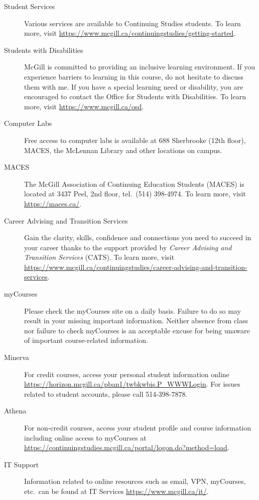 \documentclass{article}
\begin{document}
\begin{description}
\item[Student Services]{Various services are available to Continuing
  Studies students. To learn more, visit \url{https://www.mcgill.ca/continuingstudies/getting-started}.}
\item[Students with Disabilities]{McGill is committed to providing an
  inclusive learning environment. If you experience barriers to
  learning in this course, do not hesitate to discuss them with me. If
  you have a special learning need or disability, you are encouraged
  to contact the Office for Students with Disabilities. To learn more,
  visit \url{https://www.mcgill.ca/osd}.}
 \item[Computer Labs]{Free access to computer labs is available at 688
   Sherbrooke (12th floor), MACES, the McLennan Library and other
   locations on campus.}
 \item[MACES]{The McGill Association of Continuing Education Students
   (MACES) is located at 3437 Peel, 2nd floor, tel.\ (514) 398-4974. To
   learn more, visit \url{https://maces.ca/}.}
\item[Career Advising and Transition Services]{Gain the clarity,
  skills, confidence and connections you need to succeed in your
  career thanks to the support provided by {\em Career Advising and
    Transition Services} (CATS). To learn more, visit
  \url{https://www.mcgill.ca/continuingstudies/career-advising-and-transition-services}.}
\item[myCourses]{Please check the myCourses site on a daily
  basis. Failure to do so may result in your missing important
  information. Neither absence from class nor failure to check
  myCourses is an acceptable excuse for being unaware of important
  course-related information.}
\item[Minerva]{For credit courses, access your personal student information online
  \url{https://horizon.mcgill.ca/pban1/twbkwbis.P_WWWLogin}. For
  issues related to student accounts, please call 514-398-7878.}
\item[Athena]{For non-credit courses, access your student profile and
  course information including online access to myCourses at
  \url{https://continuingstudies.mcgill.ca/portal/logon.do?method=load}.}
\item[IT Support]{Information related to online resources such as
  email, VPN, myCourses, etc.\ can be found at IT Services
  \url{https://www.mcgill.ca/it/}.}
\end{description}

\label{LastPage}
\end{document}
